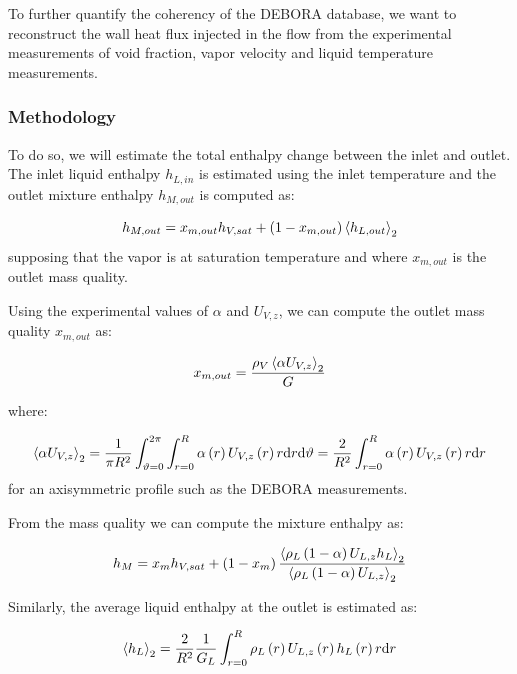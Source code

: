 To further quantify the coherency of the DEBORA database, we want to reconstruct the wall heat flux injected in the flow from the experimental measurements of void fraction, vapor velocity and liquid temperature measurements.

\subsubsection{Methodology}

To do so, we will estimate the total enthalpy change between the inlet and outlet. The inlet liquid enthalpy $h_{L,in}$ is estimated using the inlet temperature and the outlet mixture enthalpy $h_{M,out}$ is computed as:

\begin{equation}
h_{M,out}=x_{m,out}h_{V,sat}+\left( 1-x_{m,out} \right)\left< h_{L,out} \right>_{2}
\end{equation}
supposing that the vapor is at saturation temperature and where $x_{m,out}$ is the outlet mass quality.

\npar
Using the experimental values of $\alpha$ and $U_{V,z}$, we can compute the outlet mass quality $x_{m,out}$ as:

\begin{equation}
x_{m,out} = \frac{\rho_{V}\left< \alpha U_{V,z} \right>_{2}}{G}
\end{equation}

where:

\begin{equation}
\left< \alpha U_{V,z} \right>_{2} = \frac{1}{\pi R^{2}}\int_{\vartheta=0}^{2\pi} \int_{r=0}^{R} \alpha\left( r \right) U_{V,z}\left( r \right) r \mathrm{d}r \mathrm{d}\vartheta = \frac{2}{R^{2}}\int_{r=0}^{R}  \alpha\left( r \right) U_{V,z}\left( r \right) r \mathrm{d}r
\end{equation}
for an axisymmetric profile such as the DEBORA measurements.

\npar

From the mass quality we can compute the mixture enthalpy as:

\begin{equation}
h_{M} = x_{m} h_{V,sat} + \left( 1-x_{m} \right) \frac{\left< \rho_{L}\left( 1-\alpha \right)U_{L,z}h_{L} \right>_{2}}{\left< \rho_{L}\left( 1-\alpha \right)U_{L,z} \right>_{2}}
\end{equation}

\npar
Similarly, the average liquid enthalpy at the outlet is estimated as:

\begin{equation}
\left< h_{L} \right>_{2} = \frac{2}{R^{2}}\frac{1}{G_{L}}\int_{r=0}^{R} \rho_{L}\left( r \right) U_{L,z}\left( r \right) h_{L}\left( r \right) r \mathrm{d}r
\end{equation}

